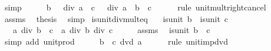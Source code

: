 \begin{isabellebody}
\ simp\isanewline
\ \ \isamarkupfalse%
\ \isamarkupfalse%
\ {\isachardoublequoteopen}b\ {\isacharasterisk}{\kern0pt}\ {\isacharparenleft}{\kern0pt}{}\ div\ a{\isacharparenright}{\kern0pt}\ {\isacharequal}{\kern0pt}\ c\ {\isacharasterisk}{\kern0pt}\ {\isacharparenleft}{\kern0pt}{}\ div\ a{\isacharparenright}{\kern0pt}\ {\isasymlongleftrightarrow}\ b\ {\isacharequal}{\kern0pt}\ c{\isachardoublequoteclose}\isanewline
\ \ \ \ \isamarkupfalse%
\ {\isacharparenleft}{\kern0pt}rule\ unit{\isacharunderscore}{\kern0pt}mult{\isacharunderscore}{\kern0pt}right{\isacharunderscore}{\kern0pt}cancel{\isacharparenright}{\kern0pt}\isanewline
\ \ \isamarkupfalse%
\ assms\ \isamarkupfalse%
\ {\isacharquery}{\kern0pt}thesis\ \isamarkupfalse%
\ simp\isanewline
{}\isamarkupfalse%
%
\endisatagproof
{\isafoldproof}%
%
\isadelimproof
\isanewline
%
\endisadelimproof
\isanewline
{}\isamarkupfalse%
\ is{\isacharunderscore}{\kern0pt}unit{\isacharunderscore}{\kern0pt}div{\isacharunderscore}{\kern0pt}mult{}{\isacharunderscore}{\kern0pt}eq{\isacharcolon}{\kern0pt}\isanewline
\ \ \ {\isachardoublequoteopen}is{\isacharunderscore}{\kern0pt}unit\ b{\isachardoublequoteclose}\ \ {\isachardoublequoteopen}is{\isacharunderscore}{\kern0pt}unit\ c{\isachardoublequoteclose}\isanewline
\ \ \ {\isachardoublequoteopen}a\ div\ {\isacharparenleft}{\kern0pt}b\ {\isacharasterisk}{\kern0pt}\ c{\isacharparenright}{\kern0pt}\ {\isacharequal}{\kern0pt}\ a\ div\ b\ div\ c{\isachardoublequoteclose}\isanewline
%
\isadelimproof
%
\endisadelimproof
%
\isatagproof
{}\isamarkupfalse%
\ {\isacharminus}{\kern0pt}\isanewline
\ \ \isamarkupfalse%
\ assms\ \isamarkupfalse%
\ {\isachardoublequoteopen}is{\isacharunderscore}{\kern0pt}unit\ {\isacharparenleft}{\kern0pt}b\ {\isacharasterisk}{\kern0pt}\ c{\isacharparenright}{\kern0pt}{\isachardoublequoteclose}\isanewline
\ \ \ \ \isamarkupfalse%
\ {\isacharparenleft}{\kern0pt}simp\ add{\isacharcolon}{\kern0pt}\ unit{\isacharunderscore}{\kern0pt}prod{\isacharparenright}{\kern0pt}\isanewline
\ \ \isamarkupfalse%
\ \isamarkupfalse%
\ {\isachardoublequoteopen}b\ {\isacharasterisk}{\kern0pt}\ c\ dvd\ a{\isachardoublequoteclose}\isanewline
\ \ \ \ \isamarkupfalse%
\ {\isacharparenleft}{\kern0pt}rule\ unit{\isacharunderscore}{\kern0pt}imp{\isacharunderscore}{\kern0pt}dvd{\isacharparenright}{\kern0pt}\isanewline

\end{isabellebody}
